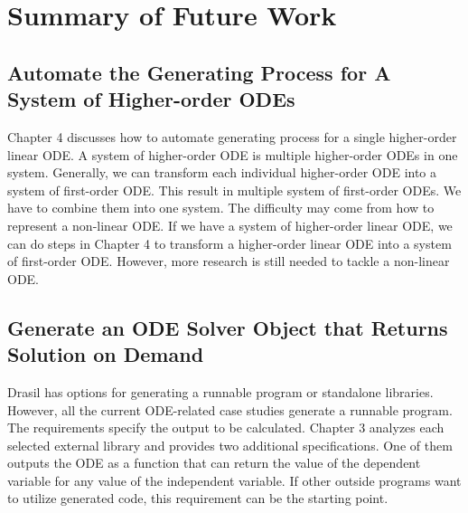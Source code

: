 \chapter{Summary of Future Work}

\section{Automate the Generating Process for A System of Higher-order ODEs}
Chapter 4 discusses how to automate generating process for a single higher-order linear ODE. A system of higher-order ODE is multiple higher-order ODEs in one system. Generally, we can transform each individual higher-order ODE into a system of first-order ODE. This result in multiple system of first-order ODEs. We have to combine them into one system. The difficulty may come from how to represent a non-linear ODE. If we have a system of higher-order linear ODE, we can do steps in Chapter 4 to transform a higher-order linear ODE into a system of first-order ODE. However, more research is still needed to tackle a non-linear ODE.

\section{Generate an ODE Solver Object that Returns Solution on Demand}
Drasil has options for generating a runnable program or standalone libraries. However, all the current ODE-related case studies generate a runnable program. The requirements specify the output to be calculated. Chapter 3 analyzes each selected external library and provides two additional specifications. One of them outputs the ODE as a function that can return the value of the dependent variable for any value of the independent variable. If other outside programs want to utilize generated code, this requirement can be the starting point.




